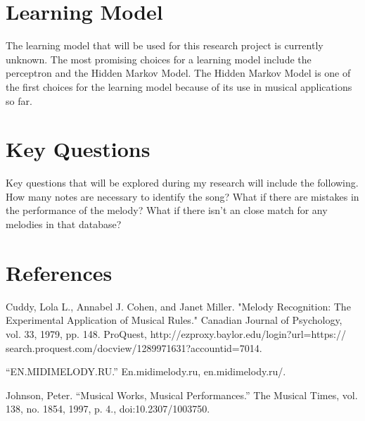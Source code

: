\documentclass{article}
\begin{document}
	\section{Learning Model}
	The learning model that will be used for this research project is currently unknown. The most promising choices for a learning model include the perceptron and the Hidden Markov Model. The Hidden Markov Model is one of the first choices for the learning model because of its use in musical applications so far.
	
	\section{Key Questions}
	Key questions that will be explored during my research will include the following. How many notes are necessary to identify the song? What if there are mistakes in the performance of the melody? What if there isn't an close match for any melodies in that database?
	
	\section{References}
	Cuddy, Lola L., Annabel J. Cohen, and Janet Miller. "Melody Recognition: The Experimental Application of Musical Rules." Canadian Journal of Psychology, vol. 33, 1979, pp. 148. ProQuest, http://ezproxy.baylor.edu/login?url=https://\\search.proquest.com/docview/1289971631?accountid=7014.
	\newline
	
	\noindent
	“EN.MIDIMELODY.RU.” En.midimelody.ru, en.midimelody.ru/.
	\newline
	
	\noindent
	Johnson, Peter. “Musical Works, Musical Performances.” The Musical Times, vol. 138, no. 1854, 1997, p. 4., doi:10.2307/1003750.
	
\end{document}
